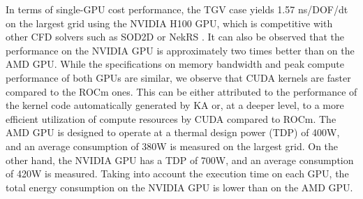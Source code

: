\documentclass[10pt,a4paper]{article}
\begin{document}
In terms of single-GPU cost performance, the TGV case yields 1.57 ns/DOF/dt on the largest grid using the NVIDIA H100 GPU, which is competitive with other CFD solvers such as SOD2D \citep{Gasparino2024} or NekRS \citep{Fischer2022}. It can also be observed that the performance on the NVIDIA GPU is approximately two times better than on the AMD GPU. While the specifications on memory bandwidth and peak compute performance of both GPUs are similar, we observe that CUDA kernels are faster compared to the ROCm ones. This can be either attributed to the performance of the kernel code automatically generated by KA or, at a deeper level, to a more efficient utilization of compute resources by CUDA compared to ROCm. The AMD GPU is designed to operate at a thermal design power (TDP) of 400W, and an average consumption of 380W is measured on the largest grid. On the other hand, the NVIDIA GPU has a TDP of 700W, and an average consumption of 420W is measured. Taking into account the execution time on each GPU, the total energy consumption on the NVIDIA GPU is lower than on the AMD GPU.
\end{document}

